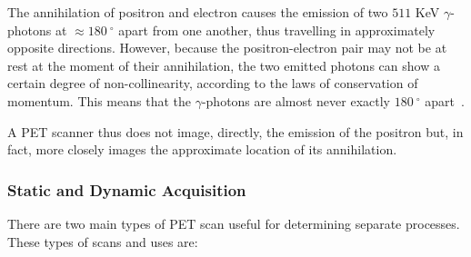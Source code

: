                 The annihilation of positron and electron causes the emission of two $511$ \gls{KeV} $\gamma$-photons at $\approx\SI{180}{^{\circ}}$ apart from one another, thus travelling in approximately opposite directions. However, because the positron-electron pair may not be at rest at the moment of their annihilation, the two emitted photons can show a certain degree of non-collinearity, according to the laws of conservation of momentum. This means that the $\gamma$-photons are almost never exactly $\SI{180}{^{\circ}}$ apart~\parencite{scienceofpetspringer}. %
                
                A \gls{PET} scanner thus does not image, directly, the emission of the positron but, in fact, more closely images the approximate location of its annihilation. %
            
            \subsubsection{Static and Dynamic Acquisition} \label{sec:static_and_dynamic_acquisition}
                There are two main types of \gls{PET} scan useful for determining separate processes. These types of scans and uses are:
                
